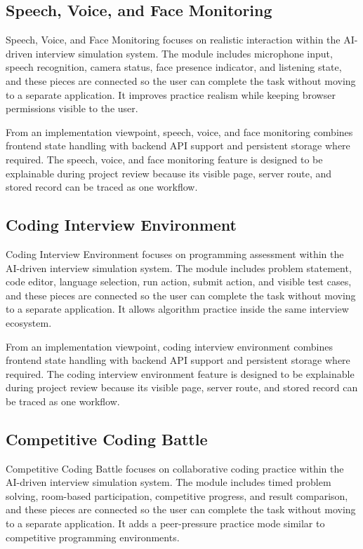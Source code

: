 \documentclass[12pt,a4paper]{report}
\begin{document}
\subsection{Speech, Voice, and Face Monitoring}

Speech, Voice, and Face Monitoring focuses on realistic interaction within the AI-driven interview simulation system. The module includes microphone input, speech recognition, camera status, face presence indicator, and listening state, and these pieces are connected so the user can complete the task without moving to a separate application. It improves practice realism while keeping browser permissions visible to the user.

From an implementation viewpoint, speech, voice, and face monitoring combines frontend state handling with backend API support and persistent storage where required. The speech, voice, and face monitoring feature is designed to be explainable during project review because its visible page, server route, and stored record can be traced as one workflow.

\subsection{Coding Interview Environment}

Coding Interview Environment focuses on programming assessment within the AI-driven interview simulation system. The module includes problem statement, code editor, language selection, run action, submit action, and visible test cases, and these pieces are connected so the user can complete the task without moving to a separate application. It allows algorithm practice inside the same interview ecosystem.

From an implementation viewpoint, coding interview environment combines frontend state handling with backend API support and persistent storage where required. The coding interview environment feature is designed to be explainable during project review because its visible page, server route, and stored record can be traced as one workflow.

\subsection{Competitive Coding Battle}

Competitive Coding Battle focuses on collaborative coding practice within the AI-driven interview simulation system. The module includes timed problem solving, room-based participation, competitive progress, and result comparison, and these pieces are connected so the user can complete the task without moving to a separate application. It adds a peer-pressure practice mode similar to competitive programming environments.
\end{document}

